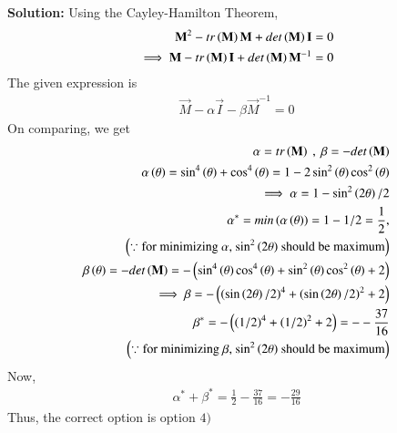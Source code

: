 \documentclass[journal,12pt,onecolumn]{IEEEtran}
\theoremstyle{remark}
\begin{document}
\textbf{Solution:}
Using the Cayley-Hamilton Theorem, 
\begin{align}
    \mathbf{M}^2 - tr\left(\mathbf{M}\right)\mathbf{M} + det\left(\mathbf{M}\right)\mathbf{I}=0\\
    \implies \mathbf{M} -tr\left(\mathbf{M}\right)\mathbf{I} + det\left(\mathbf{M}\right)\mathbf{M}^{-1} =0
\end{align}
The given expression is
\begin{align}
    \vec{M} -\alpha\vec{I} - \beta\vec{M}^{-1} =0
\end{align}
On comparing, we get
\begin{align}
    \alpha = tr\left(\mathbf{M}\right) \ , \ \beta = - det\left(\mathbf{M}\right)\\
    \alpha\left(\theta\right)=\sin^4\left(\theta\right)+\cos^4\left(\theta\right) = 1-2\sin^2\left(\theta\right)\cos^2\left(\theta\right)\\
    \implies \alpha = 1 -\sin^2\left(2\theta\right)/2 \\
    \alpha^*  = min\left(\alpha\left(\theta\right)\right)= 1- 1/2 = \frac{1}{2} ,\\ \left(\because \text{for minimizing $\alpha$,  $\sin^2\left(2\theta\right)$ should be maximum}\right)\nonumber\\
    \beta\left(\theta\right) = - det\left(\mathbf{M}\right) = - \left(\sin^4\left(\theta\right)\cos^4\left(\theta\right) + \sin^2\left(\theta\right)\cos^2\left(\theta\right) +2\right)\\
    \implies \beta = - \left( \left(\sin\left(2\theta\right)/2\right)^4 + \left(\sin\left(2\theta\right)/2\right)^2 + 2\right) \\
    \beta^* = - \left( \left(1/2\right)^4 + \left(1/2\right)^2 + 2\right)=--\frac{37}{16}\\
    \left(\because \text{for minimizing $\beta$,  $\sin^2\left(2\theta\right)$ should be maximum}\right)\nonumber
\end{align}
Now, 
\begin{align}
    \alpha^*+\beta^* = \frac{1}{2} - \frac{37}{16} = -\frac{29}{16}
\end{align}
Thus,  the correct option is option $4)$
\end{document}
